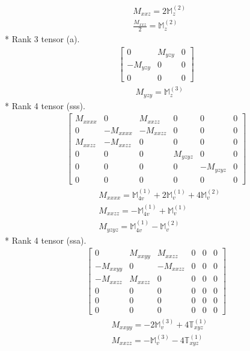 \documentclass[fleqn,8pt,landscape]{jsarticle}
\begin{document}
\begin{align*}
& M_{xxz} = 2 \mathbb{M}_{z}^{(2)} \\
& \frac{M_{xxz}}{2} = \mathbb{M}_{z}^{(2)}
\end{align*}
* Rank 3 tensor (a).
\begin{align*}
\begin{bmatrix} 0 & M_{yzy} & 0 \\ - M_{yzy} & 0 & 0 \\ 0 & 0 & 0 \end{bmatrix}
\end{align*}
\begin{align*}
& M_{yzy} = \mathbb{M}_{z}^{(3)}
\end{align*}
* Rank 4 tensor (sss).
\begin{align*}
\begin{bmatrix} M_{xxxx} & 0 & M_{xxzz} & 0 & 0 & 0 \\ 0 & - M_{xxxx} & - M_{xxzz} & 0 & 0 & 0 \\ M_{xxzz} & - M_{xxzz} & 0 & 0 & 0 & 0 \\ 0 & 0 & 0 & M_{yzyz} & 0 & 0 \\ 0 & 0 & 0 & 0 & - M_{yzyz} & 0 \\ 0 & 0 & 0 & 0 & 0 & 0 \end{bmatrix}
\end{align*}
\begin{align*}
& M_{xxxx} = \mathbb{M}_{4v}^{(1)} + 2 \mathbb{M}_{v}^{(1)} + 4 \mathbb{M}_{v}^{(2)} \\
& M_{xxzz} = - \mathbb{M}_{4v}^{(1)} + \mathbb{M}_{v}^{(1)} \\
& M_{yzyz} = \mathbb{M}_{4v}^{(1)} - \mathbb{M}_{v}^{(2)}
\end{align*}
* Rank 4 tensor (ssa).
\begin{align*}
\begin{bmatrix} 0 & M_{xxyy} & M_{xxzz} & 0 & 0 & 0 \\ - M_{xxyy} & 0 & - M_{xxzz} & 0 & 0 & 0 \\ - M_{xxzz} & M_{xxzz} & 0 & 0 & 0 & 0 \\ 0 & 0 & 0 & 0 & 0 & 0 \\ 0 & 0 & 0 & 0 & 0 & 0 \\ 0 & 0 & 0 & 0 & 0 & 0 \end{bmatrix}
\end{align*}
\begin{align*}
& M_{xxyy} = - 2 \mathbb{M}_{v}^{(3)} + 4 \mathbb{T}_{xyz}^{(1)} \\
& M_{xxzz} = - \mathbb{M}_{v}^{(3)} - 4 \mathbb{T}_{xyz}^{(1)}
\end{align*}
\end{document}
